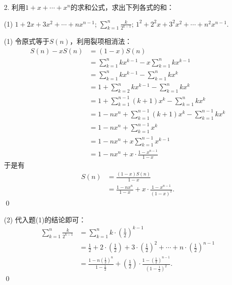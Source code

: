\exercise

2. 利用$1+x+\cdots +x^n$的求和公式，求出下列各式的和：
\begin{tasks}(1)
    \task $1+2x+3x^2+\cdots+nx^{n-1}$;
    \task $\displaystyle\sum_{k=1}^n \displaystyle\frac{k}{2^{k-1}}$;
    \task $1^2+2^2 x + 3^2 x^2 + \cdots + n^2 x^{n-1}$.
\end{tasks}

(1) \solve 令原式等于$S(n)$，利用裂项相消法：
\begin{align}
    S(n) - x S(n) &= (1-x)S(n) \\
    &= \sum_{k=1}^n k x^{k-1} - x \sum_{k=1}^{n} k x^{k-1} \\
    &= \sum_{k=1}^n k x^{k-1} - \sum_{k=1}^{n} k x^k \\
    &= 1 + \sum_{k=2}^{n} k x^{k-1} - \sum_{k=1}^{n} kx^{k} \\
    &= 1 + \sum_{k=1}^{n-1} (k+1) x^k - \sum_{k=1}^{n} k x^{k} \\
    &= 1 - n x^n + \sum_{k=1}^{n-1} (k+1) x^k - \sum_{k=1}^{n-1} k x^{k} \\
    &= 1 - nx^n + \sum_{k=1}^{n-1} x^k \\
    &= 1 - nx^n + x \sum_{k=1}^{n-1} x^{k-1} \\
    &= 1 - nx^n + x \cdot \frac{1-x^{n-1}}{1-x}
\end{align}
于是有
\begin{align}
    S(n) &= \frac{(1-x)S(n)}{1-x} \\
    &= \frac{1-nx^n}{1-x} + x \cdot \frac{1-x^{n-1}}{(1-x)^2}.
\end{align}
\qed\bigskip

(2) \solve 代入题(1)的结论即可：
\begin{align}
    \sum_{k=1}^{n} \frac{k}{2^{k-1}} &= \sum_{k=1}^n k \cdot \left( \frac{1}{2} \right)^{k-1} \\
    &= \frac{1}{2} + 2 \cdot \left(\displaystyle\frac{1}{2}\right) + 3 \cdot \left(\displaystyle\frac{1}{2}\right)^2 + \cdots + n \cdot \left(\displaystyle\frac{1}{2}\right)^{n-1} \\
    &= \frac{1 - n \left(\displaystyle\frac{1}{2}\right)^n}{1 - \displaystyle\frac{1}{2}} + \left(\displaystyle\frac{1}{2}\right) \cdot \frac{1 - \left(\displaystyle\frac{1}{2}\right)^{n-1}}{\left(1-\displaystyle\frac{1}{2}\right)^2}.
\end{align}
\qed\bigskip

